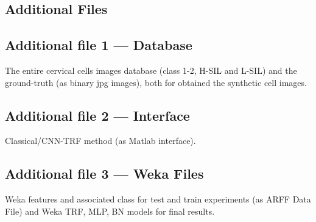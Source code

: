 \documentclass{bmcart}
\begin{document}
\begin{backmatter}

\section*{Additional Files}
  \subsection*{Additional file 1 --- Database}
    The entire cervical cells images database (class 1-2, H-SIL and L-SIL) and the ground-truth (as binary jpg images), both for obtained the synthetic cell images.
  \subsection*{Additional file 2 --- Interface}
    Classical/CNN-TRF method (as Matlab interface).
  \subsection*{Additional file 3 --- Weka Files}
    Weka features and associated class for test and train experiments (as ARFF Data File) and Weka TRF, MLP, BN models for final results.



\end{backmatter}
\end{document}
